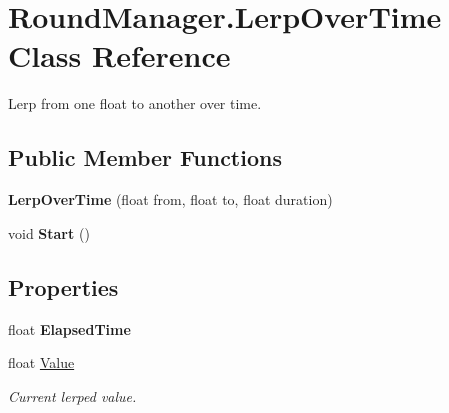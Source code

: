 \hypertarget{class_round_manager_1_1_lerp_over_time}{}\section{Round\+Manager.\+Lerp\+Over\+Time Class Reference}
\label{class_round_manager_1_1_lerp_over_time}


Lerp from one float to another over time.  


\subsection*{Public Member Functions}
\begin{DoxyCompactItemize}
\item 
\hypertarget{class_round_manager_1_1_lerp_over_time_a586062c8728a163c33f6c445f5a9fe22}{}{\bfseries Lerp\+Over\+Time} (float from, float to, float duration)\label{class_round_manager_1_1_lerp_over_time_a586062c8728a163c33f6c445f5a9fe22}

\item 
\hypertarget{class_round_manager_1_1_lerp_over_time_a4f363c3847a770901a1cf68a52b4389a}{}void {\bfseries Start} ()\label{class_round_manager_1_1_lerp_over_time_a4f363c3847a770901a1cf68a52b4389a}

\end{DoxyCompactItemize}
\subsection*{Properties}
\begin{DoxyCompactItemize}
\item 
\hypertarget{class_round_manager_1_1_lerp_over_time_a5af36cea00691c5bd53886c8ae967ed3}{}float {\bfseries Elapsed\+Time}\label{class_round_manager_1_1_lerp_over_time_a5af36cea00691c5bd53886c8ae967ed3}

\item 
float \hyperlink{class_round_manager_1_1_lerp_over_time_af08cee578d3b1f907bf4b273a6cb564e}{Value}
\begin{DoxyCompactList}\small\item\em Current lerped value. \end{DoxyCompactList}\end{DoxyCompactItemize}


